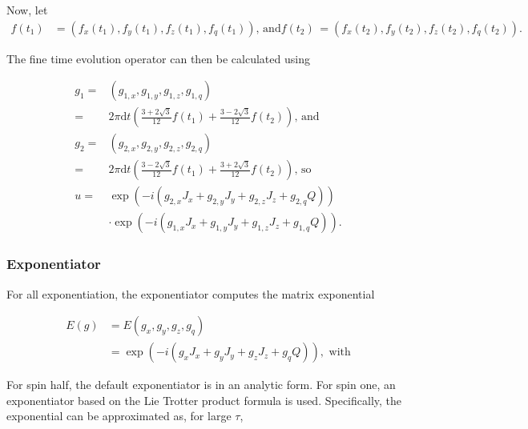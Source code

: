 \documentclass{jors}
\begin{document}
			Now, let
			\begin{align}
				f(t_1) &= (f_x(t_1), f_y(t_1), f_z(t_1), f_q(t_1))\textrm{, and}
				f(t_2) &= (f_x(t_2), f_y(t_2), f_z(t_2), f_q(t_2)).
			\end{align}
			
			The fine time evolution operator can then be calculated using
			
			\begin{align}
				g_1 =& (g_{1,x}, g_{1,y}, g_{1,z}, g_{1,q})\\
				=& 2 \pi \mathrm{d}t \left(\frac{3 + 2 \sqrt{3}}{12} f(t_1) + \frac{3 - 2 \sqrt{3}}{12} f(t_2)\right)\textrm{, and}\\
				g_2 =& (g_{2,x}, g_{2,y}, g_{2,z}, g_{2,q})\\
				=& 2 \pi \mathrm{d}t \left(\frac{3 - 2 \sqrt{3}}{12} f(t_1) + \frac{3 + 2 \sqrt{3}}{12} f(t_2)\right)\textrm{, so}\\
				u =& \exp(-i \left( g_{2,x} J_x + g_{2,y} J_y + g_{2,z} J_z + g_{2,q} Q\right))\\
				&\cdot\exp(-i \left( g_{1,x} J_x + g_{1,y} J_y + g_{1,z} J_z + g_{1,q} Q\right)).
			\end{align}

		\subsubsection*{Exponentiator}
			For all exponentiation, the exponentiator computes the matrix exponential
			
			\begin{align}
				E(g) &= E(g_x, g_y, g_z, g_q)\\
				&= \exp(-i (g_x J_x + g_y J_y + g_z J_z + g_q Q)), \textrm{ with}
			\end{align}
			
			For spin half, the default exponentiator is in an analytic form. For spin one, an exponentiator based on the Lie Trotter product formula \cite{moler_nineteen_2003} is used. Specifically, the exponential can be approximated as, for large \(\tau\),
\end{document}
